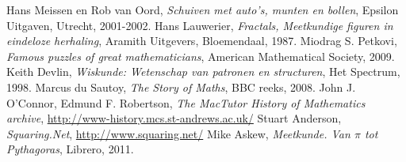 
\begin{thebibliography}{8}
\label{1} Hans Meissen en Rob van Oord, \textit{Schuiven met auto's, munten en bollen}, Epsilon Uitgaven, Utrecht, 2001-2002.
\label{2} Hans Lauwerier, \textit{Fractals, Meetkundige figuren in eindeloze herhaling}, Aramith Uitgevers, Bloemendaal, 1987.
\label{3} Miodrag S. Petkovi, \textit{Famous puzzles of great mathematicians}, American Mathematical Society, 2009.
\label{4} Keith Devlin, \textit{Wiskunde: Wetenschap van patronen en structuren}, Het Spectrum, 1998.
\label{5} Marcus du Sautoy, \textit{The Story of Maths}, BBC reeks, 2008.
\label{6} John J. O'Connor, Edmund F. Robertson, \textit{The MacTutor History of Mathematics archive}, \url{http://www-history.mcs.st-andrews.ac.uk/}
\label{7} Stuart Anderson, \textit{Squaring.Net}, \url{http://www.squaring.net/}
\label{8} Mike Askew, \textit{Meetkunde. Van $\pi$ tot Pythagoras}, Librero, 2011.
\end{thebibliography}
